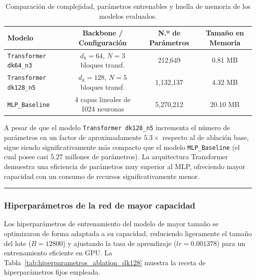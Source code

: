 \documentclass[12pt, a4paper]{article}
\begin{document}
\begin{table}[htbp]\label{tab:model_parameters_comparison}
    \centering
    \small
    \begin{tabular}{|l|c|c|c|}
    \hline
    \textbf{Modelo} & \textbf{Backbone / Configuración} & \textbf{N.º de Parámetros} & \textbf{Tamaño en Memoria} \\
    \hline
    \texttt{Transformer dk64\_n3} & $d_k = 64$, $N = 3$ bloques transf. & 212,649 & 0.81 MB \\
    \texttt{Transformer dk128\_n5} & $d_k = 128$, $N = 5$ bloques transf. & 1,132,137 & 4.32 MB \\
    \texttt{MLP\_Baseline} & 4 capas lineales de 1024 neuronas & 5,270,212 & 20.10 MB \\
    \hline
    \end{tabular}
    \caption[Parámetros y complejidad de modelos]{Comparación de complejidad, parámetros entrenables y huella de memoria de los modelos evaluados.}
    \label{tab:model_parameters_comparison}
\end{table}

A pesar de que el modelo \texttt{Transformer dk128\_n5} incrementa el número de parámetros en un factor de aproximadamente $5.3\times$ respecto al de ablación base, sigue siendo significativamente más compacto que el modelo \texttt{MLP\_Baseline} (el cual posee casi 5.27 millones de parámetros). La arquitectura Transformer demuestra una eficiencia de parámetros muy superior al MLP, ofreciendo mayor capacidad con un consumo de recursos significativamente menor.

\rule{\textwidth}{0.2pt}
\subsubsection{Hiperparámetros de la red de mayor capacidad}

Los hiperparámetros de entrenamiento del modelo de mayor tamaño se optimizaron de forma adaptada a su capacidad, reduciendo ligeramente el tamaño del lote ($B = 12800$) y ajustando la tasa de aprendizaje ($lr = 0.001378$) para un entrenamiento eficiente en GPU. La Tabla~\ref{tab:hiperparametros_ablation_dk128} muestra la receta de hiperparámetros fijos empleada.
\end{document}

